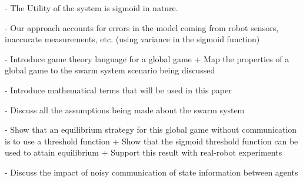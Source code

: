 \documentclass[conference]{IEEEtran}
\begin{document}
- The Utility of the system is sigmoid in nature.

- Our approach accounts for errors in the model coming from robot sensors, inaccurate measurements, etc. (using variance in the sigmoid function)

- Introduce game theory language for a global game
  + Map the properties of a global game to the swarm system scenario being discussed

- Introduce mathematical terms that will be used in this paper

- Discuss all the assumptions being made about the swarm system

- Show that an equilibrium strategy for this global game without communication is to use a threshold function
  + Show that the sigmoid threshold function can be used to attain equilibrium
  + Support this result with real-robot experiments
  
- Discuss the impact of noisy communication of state information between agents  


\end{document}

